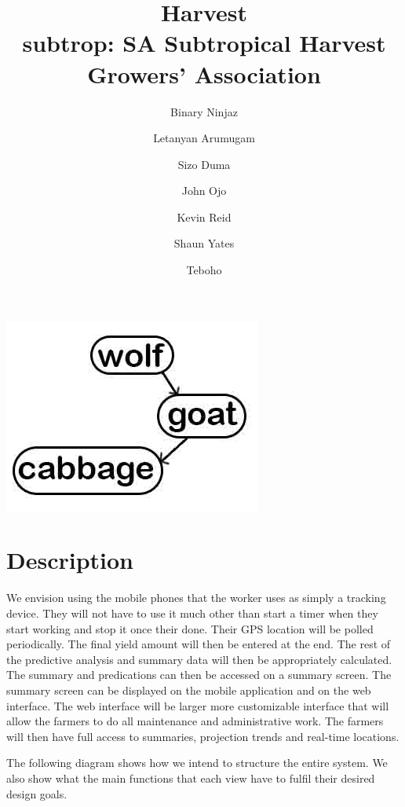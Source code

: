 \documentclass[12pt]{article}
\title{Harvest \\
\large subtrop: SA Subtropical Harvest Growers' Association
}
\author{Binary Ninjaz \and Letanyan Arumugam \and Sizo Duma \and John Ojo \and Kevin Reid \and Shaun Yates \and Teboho}
\date{}
\begin{document}
	\maketitle
	\begin{center}
	\includegraphics{team}	
	\end{center}
	

	\newpage
	
	\section*{Description}
	We envision using the mobile phones that the worker uses as simply a tracking device. They will not have to use it much other than start a timer when they start working and stop it once their done. Their GPS location will be polled periodically. The final yield amount will then be entered at the end. The rest of the predictive analysis and summary data will then be appropriately calculated. The summary and predications can then be accessed on a summary screen. The summary screen can be displayed on the mobile application and on the web interface. The web interface will be larger more customizable interface that will allow the farmers to do all maintenance and administrative work. The farmers will then have full access to summaries, projection trends and real-time locations.
	
	The following diagram shows how we intend to structure the entire system. We also show what the main functions that each view have to fulfil their desired design goals.
	
\end{document}
